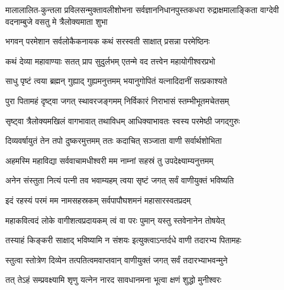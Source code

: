 
{मालालालित-कुन्तला प्रविलसन्मुक्तावलीशोभना}
{सर्वज्ञाननिधानपुस्तकधरा रुद्राक्षमालाङ्किता}
{वाग्देवी वदनाम्बुजे वसतु मे त्रैलोक्यमाता शुभा}


\twolineshloka
{भगवन् परमेशान सर्वलोकैकनायक}
{कथं सरस्वती साक्षात् प्रसन्ना परमेष्ठिनः}%

\twolineshloka
{कथं देव्या महावाण्याः सतत् प्राप सुदुर्लभम्}
{एतन्मे वद तत्त्वेन महायोगीश्वरप्रभो}%



\twolineshloka
{साधु पृष्टं त्वया ब्रह्मन् गुह्याद् गुह्यमनुत्तमम्}
{भयानुगोपितं यत्नादिदानीं सत्प्रकाश्यते}%

\twolineshloka
{पुरा पितामहं दृष्ट्वा जगत् स्थावरजङ्गमम्}
{निर्विकारं निराभासं स्तम्भीभूतमचेतसम्}%

\twolineshloka
{सृष्ट्वा त्रैलोक्यमखिलं वागभावात् तथाविधम्}
{आधिक्याभावतः स्वस्य परमेष्ठी जगद्गुरुः}%

\twolineshloka
{दिव्यवर्षायुतं तेन तपो दुष्करमुत्तमम्}
{ततः कदाचित् सञ्जाता वाणी सर्वार्थशोभिता}%

\twolineshloka
{अहमस्मि महाविद्या सर्ववाचामधीश्वरी}
{मम नाम्नां सहस्रं तु उपदेक्ष्याम्यनुत्तमम्}%

\twolineshloka
{अनेन संस्तुता नित्यं पत्नी तव भवाम्यहम्}
{त्वया सृष्टं जगत् सर्वं वाणीयुक्तं भविष्यति}%

\twolineshloka
{इदं रहस्यं परमं मम नामसहस्रकम्}
{सर्वपापौघशमनं महासारस्वतप्रदम्}%

\twolineshloka
{महाकवित्वदं लोके वागीशत्वप्रदायकम्}
{त्वं वा परः पुमान् यस्तु स्तवेनानेन तोषयेत्}%

\twolineshloka
{तस्याहं किङ्करी साक्षाद् भविष्यामि न संशयः}
{इत्युक्त्वाऽन्तर्दधे वाणी तदारभ्य पितामहः}%

\twolineshloka
{स्तुत्वा स्तोत्रेण दिव्येन तत्पतित्वमवाप्तवान्}
{वाणीयुक्तं जगत् सर्वं तदारभ्याभवन्मुने}%

\twolineshloka
{तत् तेऽहं सम्प्रवक्ष्यामि शृणु यत्नेन नारद}
{सावधानमना भूत्वा क्षणं शुद्धो मुनीश्वरः}%




